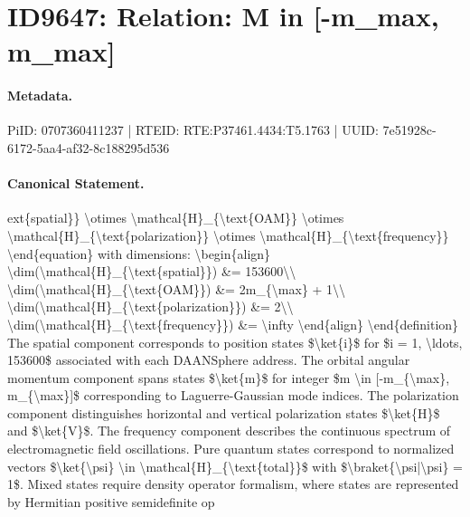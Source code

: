 \section*{ID9647: Relation: M in [-m\_max, m\_max]}
\paragraph{Metadata.}
PiID: 0707360411237 | RTEID: RTE:P37461.4434:T5.1763 | UUID: 7e51928c-6172-5aa4-af32-8c188295d536

\paragraph{Canonical Statement.}
ext\{spatial\}\} \textbackslash{}otimes \textbackslash{}mathcal\{H\}\_\{\textbackslash{}text\{OAM\}\} \textbackslash{}otimes \textbackslash{}mathcal\{H\}\_\{\textbackslash{}text\{polarization\}\} \textbackslash{}otimes \textbackslash{}mathcal\{H\}\_\{\textbackslash{}text\{frequency\}\} \textbackslash{}end\{equation\} with dimensions: \textbackslash{}begin\{align\} \textbackslash{}dim(\textbackslash{}mathcal\{H\}\_\{\textbackslash{}text\{spatial\}\}) \&= 153600\textbackslash{}\textbackslash{} \textbackslash{}dim(\textbackslash{}mathcal\{H\}\_\{\textbackslash{}text\{OAM\}\}) \&= 2m\_\{\textbackslash{}max\} + 1\textbackslash{}\textbackslash{} \textbackslash{}dim(\textbackslash{}mathcal\{H\}\_\{\textbackslash{}text\{polarization\}\}) \&= 2\textbackslash{}\textbackslash{} \textbackslash{}dim(\textbackslash{}mathcal\{H\}\_\{\textbackslash{}text\{frequency\}\}) \&= \textbackslash{}infty \textbackslash{}end\{align\} \textbackslash{}end\{definition\} The spatial component corresponds to position states \$\textbackslash{}ket\{i\}\$ for \$i = 1, \textbackslash{}ldots, 153600\$ associated with each DAANSphere address. The orbital angular momentum component spans states \$\textbackslash{}ket\{m\}\$ for integer \$m \textbackslash{}in [-m\_\{\textbackslash{}max\}, m\_\{\textbackslash{}max\}]\$ corresponding to Laguerre-Gaussian mode indices. The polarization component distinguishes horizontal and vertical polarization states \$\textbackslash{}ket\{H\}\$ and \$\textbackslash{}ket\{V\}\$. The frequency component describes the continuous spectrum of electromagnetic field oscillations. Pure quantum states correspond to normalized vectors \$\textbackslash{}ket\{\textbackslash{}psi\} \textbackslash{}in \textbackslash{}mathcal\{H\}\_\{\textbackslash{}text\{total\}\}\$ with \$\textbackslash{}braket\{\textbackslash{}psi|\textbackslash{}psi\} = 1\$. Mixed states require density operator formalism, where states are represented by Hermitian positive semidefinite op

